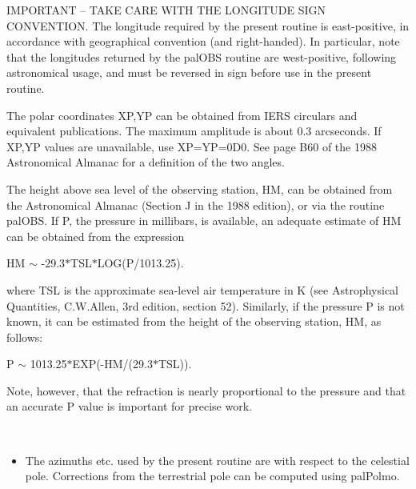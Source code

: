 \documentclass[twoside,11pt]{article}
\renewcommand{\_}{\texttt{\symbol{95}}}
\newcommand{\sstitemlist}[1]{
  \mbox{} \\
  \vspace{-3.5ex}
  \begin{itemize}
     #1
  \end{itemize}
}
\newcommand{\sstitem}{\item}
\newcommand{\sstitemlist}[1]{
      \begin{itemize}
         #1
      \end{itemize}
      \\
   }
\newcommand{\sstitem}{\item}
\begin{document}
{{{         \sstitem
         IMPORTANT -- TAKE CARE WITH THE LONGITUDE SIGN CONVENTION.
         The longitude required by the present routine is east-positive,
         in accordance with geographical convention (and right-handed).
         In particular, note that the longitudes returned by the
         palOBS routine are west-positive, following astronomical
         usage, and must be reversed in sign before use in the present
         routine.

         \sstitem
         The polar coordinates XP,YP can be obtained from IERS
         circulars and equivalent publications.  The maximum amplitude
         is about 0.3 arcseconds.  If XP,YP values are unavailable,
         use XP=YP=0D0.  See page B60 of the 1988 Astronomical Almanac
         for a definition of the two angles.

         \sstitem
         The height above sea level of the observing station, HM,
         can be obtained from the Astronomical Almanac (Section J
         in the 1988 edition), or via the routine palOBS.  If P,
         the pressure in millibars, is available, an adequate
         estimate of HM can be obtained from the expression

      }
             HM $\sim$ -29.3$*$TSL$*$LOG(P/1013.25).

      where TSL is the approximate sea-level air temperature in K
      (see Astrophysical Quantities, C.W.Allen, 3rd edition,
      section 52).  Similarly, if the pressure P is not known,
      it can be estimated from the height of the observing
      station, HM, as follows:

             P $\sim$ 1013.25$*$EXP(-HM/(29.3$*$TSL)).

      Note, however, that the refraction is nearly proportional to the
      pressure and that an accurate P value is important for precise
      work.

      \sstitemlist{

         \sstitem
         The azimuths etc. used by the present routine are with respect
         to the celestial pole.  Corrections from the terrestrial pole
         can be computed using palPolmo.
      }
   }
}
\end{document}
